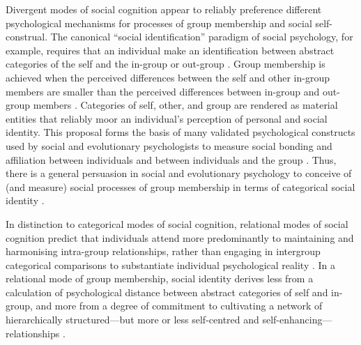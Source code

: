 \begin{CJK}{UTF8}{gbsn}
Divergent modes of social cognition appear to reliably preference different psychological mechanisms for processes of group membership and social self-construal.  The canonical ``social identification'' paradigm of social psychology, for example, requires that an individual make an identification between abstract categories of the self and the in-group or out-group \citep{Turner1987}. Group membership is achieved when the perceived differences between the self and other in-group members are smaller than the perceived differences between in-group and out-group members \citep{Yuki2014}. Categories of self, other, and group are rendered as material entities that reliably moor an individual's perception of personal and social identity.  This proposal forms the basis of many validated psychological constructs used by social and evolutionary psychologists to measure social bonding and affiliation between individuals and between individuals and the group \citep{Swann2009,Wolf2015}.  Thus, there is a general persuasion in social and evolutionary psychology to conceive of (and measure) social processes of group membership in terms of categorical social identity \citep{Liu2015a}.


In distinction to categorical modes of social cognition, relational modes of social cognition predict that individuals attend more predominantly to maintaining and harmonising intra-group relationships, rather than engaging in intergroup categorical comparisons to substantiate individual psychological reality \citep{Yuki2003}.  In a relational mode of group membership, social identity derives less from a calculation of psychological distance between abstract categories of self and in-group, and more from a degree of commitment to cultivating a network of hierarchically structured---but more or less self-centred and self-enhancing---relationships \citep{Liu2009,Nisbett2003}.


\end{CJK}
